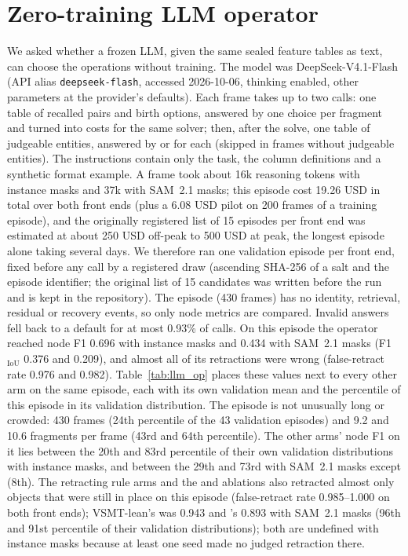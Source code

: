 \section{Zero-training LLM operator}
\label{app:llm}
We asked whether a frozen LLM, given the same sealed feature tables as text, can choose the operations without training.
The model was DeepSeek-V4.1-Flash (API alias \texttt{deepseek-flash}, accessed 2026-10-06, thinking enabled, other parameters at the provider's defaults).
Each frame takes up to two calls: one table of recalled pairs and birth options, answered by one choice per fragment and turned into costs for the same solver; then, after the solve, one table of judgeable entities, answered by  or  for each (skipped in frames without judgeable entities).
The instructions contain only the task, the column definitions and a synthetic format example.
A frame took about 16k reasoning tokens with instance masks and 37k with SAM~2.1 masks; this episode cost 19.26 USD in total over both front ends (plus a 6.08 USD pilot on 200 frames of a training episode), and the originally registered list of 15 episodes per front end was estimated at about 250 USD off-peak to 500 USD at peak, the longest episode alone taking several days. We therefore ran one validation episode per front end, fixed before any call by a registered draw (ascending SHA-256 of a salt and the episode identifier; the original list of 15 candidates was written before the run and is kept in the repository).
The episode (430 frames) has no identity, retrieval, residual or recovery events, so only node metrics are compared.
Invalid answers fell back to a default for at most 0.93\% of calls.
On this episode the operator reached node F1 0.696 with instance masks and 0.434 with SAM~2.1 masks (F1$_\mathrm{IoU}$ 0.376 and 0.209), and almost all of its retractions were wrong (false-retract rate 0.976 and 0.982).
Table~\ref{tab:llm_op} places these values next to every other arm on the same episode, each with its own validation mean and the percentile of this episode in its validation distribution.
The episode is not unusually long or crowded: 430 frames (24th percentile of the 43 validation episodes) and 9.2 and 10.6 fragments per frame (43rd and 64th percentile).
The other arms' node F1 on it lies between the 20th and 83rd percentile of their own validation distributions with instance masks, and between the 29th and 73rd with SAM~2.1 masks except  (8th).
The retracting rule arms and the  and  ablations also retracted almost only objects that were still in place on this episode (false-retract rate 0.985--1.000 on both front ends); VSMT-lean's was 0.943 and 's 0.893 with SAM~2.1 masks (96th and 91st percentile of their validation distributions); both are undefined with instance masks because at least one seed made no judged retraction there.
